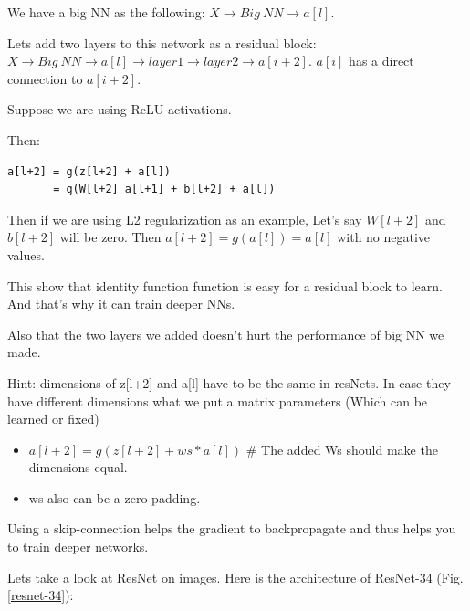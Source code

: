 We have a big NN as the following: $X \to Big\ NN\to a[l]$.

Lets add two layers to this network as a residual block: $X \to Big\ NN\to a[l] \to layer1 \to layer2\to a[i+2]$. $a[i]$ has a direct connection to $a[i+2]$.

Suppose we are using ReLU activations.

Then:

\begin{lstlisting}
a[l+2] = g(z[l+2] + a[l])
       = g(W[l+2] a[l+1] + b[l+2] + a[l])
\end{lstlisting}

Then if we are using L2 regularization as an example,  Let's say $W[l+2]$ and $b[l+2]$ will be zero. Then $a[l+2]=g(a[l]) = a[l]$ with no negative values.

This show that identity function function is easy for a residual block to learn. And that's why it can train deeper NNs.

Also that the two layers we added doesn't hurt the performance of big NN we made.

Hint: dimensions of z[l+2] and a[l] have to be the same in resNets. In case they have different dimensions what we put a matrix parameters (Which can be learned or fixed)

\begin{itemize}
    \item $a[l+2] = g( z[l+2] + ws * a[l] )$ \# The added Ws should make the dimensions equal.
    \item ws also can be a zero padding.
\end{itemize}

Using a skip-connection helps the gradient to backpropagate and thus helps you to train deeper networks.

Lets take a look at ResNet on images. Here is the architecture of ResNet-34 (Fig. \ref{resnet-34}):

